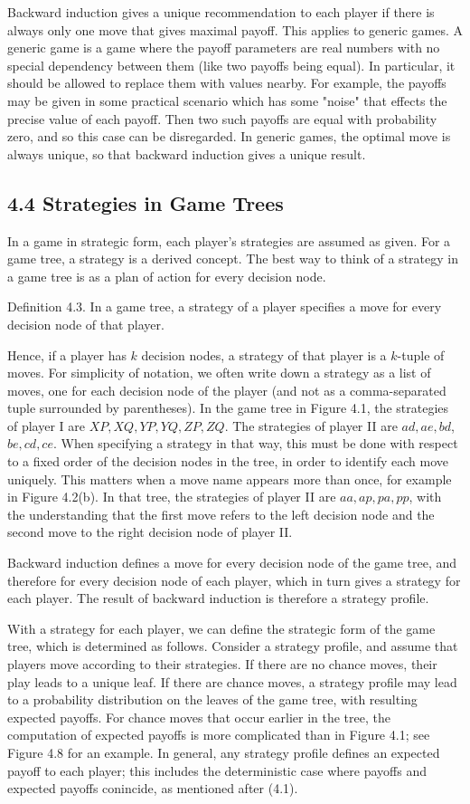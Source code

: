 \documentclass[12pt]{article}
\begin{document}
Backward induction gives a unique recommendation to each player if there is always only one move that gives maximal payoff. This applies to generic games. A generic game is a game where the payoff parameters are real numbers with no special dependency between them (like two payoffs being equal). In particular, it should be allowed to replace them with values nearby. For example, the payoffs may be given in some practical scenario which has some "noise" that effects the precise value of each payoff. Then two such payoffs are equal with probability zero, and so this case can be disregarded. In generic games, the optimal move is always unique, so that backward induction gives a unique result.

\subsection*{4.4 Strategies in Game Trees}
In a game in strategic form, each player's strategies are assumed as given. For a game tree, a strategy is a derived concept. The best way to think of a strategy in a game tree is as a plan of action for every decision node.

Definition 4.3. In a game tree, a strategy of a player specifies a move for every decision node of that player.

Hence, if a player has $k$ decision nodes, a strategy of that player is a $k$-tuple of moves. For simplicity of notation, we often write down a strategy as a list of moves, one for each decision node of the player (and not as a comma-separated tuple surrounded by parentheses). In the game tree in Figure 4.1, the strategies of player I are $X P, X Q, Y P, Y Q, Z P, Z Q$. The strategies of player II are $a d, a e, b d$, $b e, c d, c e$. When specifying a strategy in that way, this must be done with respect to a fixed order of the decision nodes in the tree, in order to identify each move uniquely. This matters when a move name appears more than once, for example in Figure 4.2(b). In that tree, the strategies of player II are $a a, a p, p a, p p$, with the understanding that the first move refers to the left decision node and the second move to the right decision node of player II.

Backward induction defines a move for every decision node of the game tree, and therefore for every decision node of each player, which in turn gives a strategy for each player. The result of backward induction is therefore a strategy profile.

With a strategy for each player, we can define the strategic form of the game tree, which is determined as follows. Consider a strategy profile, and assume that players move according to their strategies. If there are no chance moves, their play leads to a unique leaf. If there are chance moves, a strategy profile may lead to a probability distribution on the leaves of the game tree, with resulting expected payoffs. For chance moves that occur earlier in the tree, the computation of expected payoffs is more complicated than in Figure 4.1; see Figure 4.8 for an example. In general, any strategy profile defines an expected payoff to each player; this includes the deterministic case where payoffs and expected payoffs conincide, as mentioned after (4.1).
\end{document}

